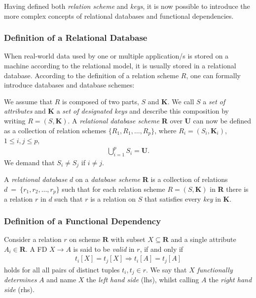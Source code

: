 Having defined both \emph{relation scheme} and \emph{keys}, it is now possible to introduce the more complex concepts of relational databases and functional dependencies.


\subsubsection{Definition of a Relational Database}
When real-world data used by one or multiple application/s is stored on a machine according to the relational model, it is usually stored in a relational database.
According to the definition of a relation scheme \(R\), one can formally introduce databases and database schemes:

We assume that \(R\) is composed of two parts, \(S\) and \(\boldsymbol{K}\). We call \(S\) a \emph{set of attributes} and \(\boldsymbol{K}\) a \emph{set of designated keys} and describe this composition by writing \(R = (S, \boldsymbol{K})\).
A \emph{relational database scheme} \textbf{R} over \textbf{U} can now be defined as a collection of relation schemes \(\{R_1, R_1, \dots, R_p\}\), where \(R_i = (S_i, \boldsymbol{K}_i)\), \(1 \leq i, j \leq p\),
\begin{align*}
    \bigcup^{p}_{i=1} S_i = \boldsymbol{U}.
\end{align*}
We demand that \(S_i \neq S_j\) if \(i \neq j\).

A \emph{relational database} \( d \) on a \emph{database scheme} \textbf{R} is a collection of relations \( d~=~\{r_1, r_2, \dots, r_p \} \) such that for each relation scheme \(R = (S, \boldsymbol{K}) \) in \textbf{R} there is a relation \(r\) in \(d\) such that \(r\) is a relation on \(S\) that satisfies every \emph{key} in \(\boldsymbol{K}\).~\cite[p.~94]{MAI83}


\subsubsection{Definition of a Functional Dependency}
Consider a relation \(r\) on scheme \(\boldsymbol{R}\) with subset \(X \subseteq \boldsymbol{R}\) and a single attribute \(A_i \in \boldsymbol{R}\).
A FD \(X \to A\) is said to be \emph{valid} in \(r\), if and only if
\begin{align}
    t_i[X] = t_j[X] \Rightarrow t_i[A] = t_j[A] \label{eq:fd-condition}
\end{align}
holds for all all pairs of distinct tuples \(t_i,t_j \in r\).\cite[p.~21]{ABE19}
We say that \(X\) \emph{functionally determines} \(A\)\cite[p.~43]{MAI83} and name \(X\) the \emph{left hand side} (lhs), whilst calling \(A\) the \emph{right hand side} (rhs).

